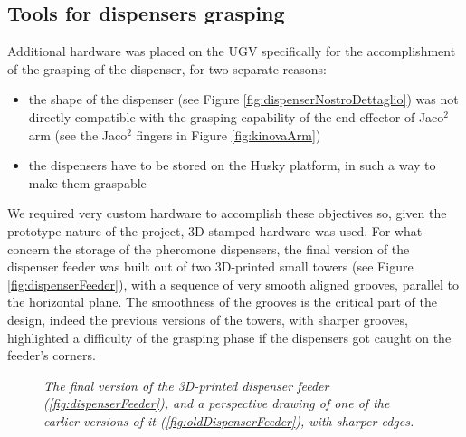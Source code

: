 \subsection{Tools for dispensers grasping}
Additional hardware was placed on the \ac{UGV} specifically for the accomplishment of the grasping of the dispenser, for two separate reasons:

\begin{itemize}
	\item the shape of the dispenser (see Figure \ref{fig:dispenserNostroDettaglio}) was not directly compatible with the grasping capability of the end effector of Jaco$^2$ arm (see the Jaco$^2$ fingers in Figure \ref{fig:kinovaArm})
	\item the dispensers have to be stored on the Husky platform, in such a way to make them graspable
\end{itemize}
We required very custom hardware to accomplish these objectives so, given the prototype nature of the project, 3D stamped hardware was used.
For what concern the storage of the pheromone dispensers, the final version of the dispenser feeder was built out of two 3D-printed small towers (see Figure \ref{fig:dispenserFeeder}), with a sequence of very smooth aligned grooves, parallel to the horizontal plane. The smoothness of the grooves is the critical part of the design, indeed the previous versions of the towers, with sharper grooves, highlighted a difficulty of the grasping phase if the dispensers got caught on the feeder's corners.

\begin{figure}
	\centering
		\qquad
	\caption{\textit{The final version of the 3D-printed dispenser feeder (\ref{fig:dispenserFeeder}), and a 	perspective drawing of one of the earlier versions of it (\ref{fig:oldDispenserFeeder}), with sharper edges.}}
\end{figure}


